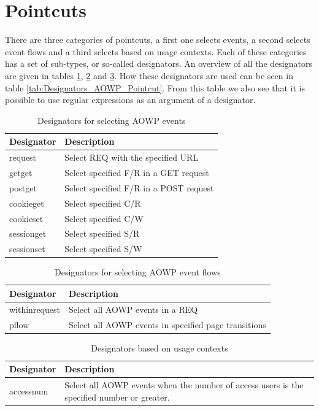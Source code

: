 \documentclass[a4paper]{report}
\begin{document}
\section{Pointcuts}
There are three categories of pointcuts, a first one selects events, a second selects event flows and a third selects based on usage contexts. Each of these categories has a set of sub-types, or so-called designators. An overview of all the designators are given in tables \ref{tab:Designators_AOWP_Events}, \ref{tab:Designators_AOWP_Flows} and \ref{tab:Designators_AOWP_Contexts}. How these designators are used can be seen in table \ref{tab:Designators_AOWP_Pointcut}. From this table we also see that it is possible to use regular expressions as an argument of a designator.\\
\begin{table}[h!]
\centering
\begin{tabular}{l|p{7cm}}
\hline
Designator & Description\\
\hline
\hline
request & Select REQ with the specified URL\\
\hline
getget & Select specified F/R in a GET request\\
\hline
postget & Select specified F/R in a POST request\\
\hline
cookieget & Select specified C/R\\
\hline
cookieset & Select specified C/W\\
\hline
sessionget & Select specified S/R\\
\hline
sessionset & Select specified S/W\\
\hline
\end{tabular}
\caption{Designators for selecting AOWP events}
\label{tab:Designators_AOWP_Events}
\end{table}
\begin{table}[h!]
\centering
\begin{tabular}{l|p{7cm}}
\hline
Designator & Description\\
\hline
\hline
withinrequest & Select all AOWP events in a REQ\\
\hline
pflow & Select all AOWP events in specified page transitions\\
\hline
\end{tabular}
\caption{Designators for selecting AOWP event flows}
\label{tab:Designators_AOWP_Flows}
\end{table}
\begin{table}[h!]
\centering
\begin{tabular}{l|p{7cm}}
\hline
Designator & Description\\
\hline
\hline
accessnum & Select all AOWP events when the number of access users is the specified number or greater.\\
\hline
\end{tabular}
\caption{Designators based on usage contexts}
\label{tab:Designators_AOWP_Contexts}
\end{table}
\end{document}
